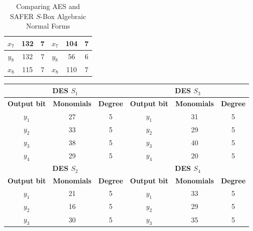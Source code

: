 \documentclass{report}
\begin{document}
\begin{table}[H]
\begin{tabular}{|c|c|c|c|c|c|}
$x_7$               & 132                & 7               & $x_7$               & 104                & 7               \\ \hline
$y_8$               & 132                & 7               & $y_8$               & 56                 & 6               \\ \hline
$x_8$               & 115                & 7               & $x_8$               & 110                & 7               \\ \hline
\end{tabular}
\caption{Comparing AES and SAFER $S$-Box Algebraic Normal Forms}
\label{tab:aes-anf-vs-safer-anf}
\end{table}

\begin{table}[H]
\begin{tabular}{|c|c|c|c|c|c|}
\hline
\multicolumn{3}{|c|}{\textbf{DES $S_1$}}                   & \multicolumn{3}{c|}{\textbf{DES $S_3$}}                    \\ \hline
\textbf{Output bit} & \textbf{Monomials} & \textbf{Degree} & \textbf{Output bit} & \textbf{Monomials} & \textbf{Degree} \\ \hline
$y_1$               & 27                 & 5               & $y_1$               & 31                 & 5               \\ \hline
$y_2$               & 33                 & 5               & $y_2$               & 29                 & 5               \\ \hline
$y_3$               & 38                 & 5               & $y_3$               & 40                 & 5               \\ \hline
$y_4$               & 29                 & 5               & $y_4$               & 20                 & 5               \\ \hline
\multicolumn{3}{|c|}{\textbf{DES $S_2$}}                   & \multicolumn{3}{c|}{\textbf{DES $S_4$}}                    \\ \hline
\textbf{Output bit} & \textbf{Monomials} & \textbf{Degree} & \textbf{Output bit} & \textbf{Monomials} & \textbf{Degree} \\ \hline
$y_1$               & 21                 & 5               & $y_1$               & 33                 & 5               \\ \hline
$y_2$               & 16                 & 5               & $y_2$               & 29                 & 5               \\ \hline
$y_3$               & 30                 & 5               & $y_3$               & 35                 & 5               \\ \hline

\end{tabular}
\end{table}
\end{document}
